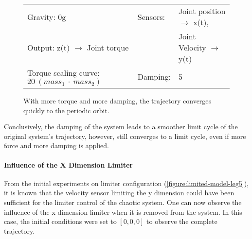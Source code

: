 \documentclass[main]{subfiles}
\begin{document}
\begin{figure}[H]
	\centering
	\begin{minipage}{1.3\textwidth}
	\hspace*{-5em}
	\end{minipage}
	\caption[Highly damped, torque strongly increased, limited chaotic controller controlling model leg]{With more torque and more damping, the trajectory converges quickly to the periodic orbit.}
	\begin{tabular}{l|ll}
	\hline 
	Gravity: 0g  & Sensors: & Joint position \(\rightarrow\) x(t),\\
	 Output: z(t) \(\rightarrow\) Joint torque &  & Joint Velocity \(\rightarrow\) y(t) \\
	  Torque scaling curve: \(20~(mass_1~\cdot~mass_2)\) & Damping: & 5 \\
	  \hline
	\end{tabular}

	\label{figure:limited-damped-model-leg-damping4}
\end{figure}

Conclusively, the damping of the system leads to a smoother limit cycle of the original system's trajectory, however, still converges to a limit cycle, even if more force and more damping is applied.

\paragraph{Influence of the X Dimension Limiter} From the initial experiments on limiter configuration (\ref{figure:limited-model-leg5}), it is known that the velocity sensor limiting the y dimension could have been sufficient for the limiter control of the chaotic system. %
%
One can now observe the influence of the x dimension limiter when it is removed from the system. In this case, the initial conditions were set to \([0,0,0]\) to observe the complete trajectory.
\end{document}
